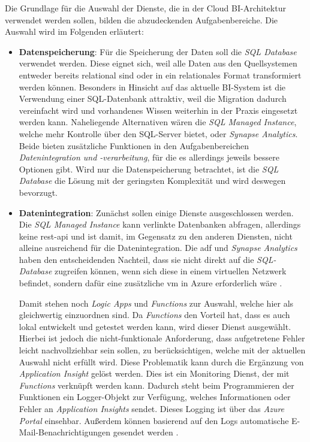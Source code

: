 Die Grundlage für die Auswahl der Dienste, die in der Cloud BI-Architektur verwendet werden sollen, bilden die abzudeckenden Aufgabenbereiche. Die Auswahl wird im Folgenden erläutert:
\begin{itemize}
\item \textbf{Datenspeicherung}: Für die Speicherung der Daten soll die \textit{SQL Database} verwendet werden. Diese eignet sich, weil alle Daten aus den Quellsystemen entweder bereits relational sind oder in ein relationales Format transformiert werden können. Besonders in Hinsicht auf das aktuelle BI-System ist die Verwendung einer SQL-Datenbank attraktiv, weil die Migration dadurch vereinfacht wird und vorhandenes Wissen weiterhin in der Praxis eingesetzt werden kann. Naheliegende Alternativen wären die \textit{SQL Managed Instance}, welche mehr Kontrolle über den SQL-Server bietet, oder \textit{Synapse Analytics}. Beide bieten zusätzliche Funktionen in den Aufgabenbereichen \textit{Datenintegration und -verarbeitung}, für die es allerdings jeweils bessere Optionen gibt. Wird nur die Datenspeicherung betrachtet, ist die \textit{SQL Database} die Lösung mit der geringsten Komplexität und wird deswegen bevorzugt.

\item \textbf{Datenintegration}: Zunächst sollen einige Dienste ausgeschlossen werden. Die \textit{SQL Managed Instance} kann verlinkte Datenbanken abfragen, allerdings keine \ac{rest}-\ac{api} und ist damit, im Gegensatz zu den anderen Diensten, nicht alleine ausreichend für die Datenintegration. Die \ac{adf} und \textit{Synapse Analytics} haben den entscheidenden Nachteil, dass sie nicht direkt auf die \textit{SQL-Database} zugreifen können, wenn sich diese in einem virtuellen Netzwerk befindet, sondern dafür eine zusätzliche \ac{vm} in Azure erforderlich wäre \cite{msdoc_22_adf_integrationRuntime}.

Damit stehen noch \textit{Logic Apps} und \textit{Functions} zur Auswahl, welche hier als gleichwertig einzuordnen sind. Da \textit{Functions} den Vorteil hat, dass es auch lokal entwickelt und getestet werden kann, wird dieser Dienst ausgewählt. Hierbei ist jedoch die nicht-funktionale Anforderung, dass aufgetretene Fehler leicht nachvollziehbar sein sollen, zu berücksichtigen, welche mit der aktuellen Auswahl nicht erfüllt wird. Diese Problematik kann durch die Ergänzung von \textit{Application Insight} gelöst werden. Dies ist ein Monitoring Dienst, der mit \textit{Functions} verknüpft werden kann. Dadurch steht beim Programmieren der Funktionen ein Logger-Objekt zur Verfügung, welches Informationen oder Fehler an \textit{Application Insights} sendet. Dieses Logging ist über das \textit{Azure Portal} einsehbar. Außerdem können basierend auf den Logs automatische E-Mail-Benachrichtigungen gesendet werden \cite[vgl.][]{satapathi_hands-azure_2021}.


\end{itemize}
